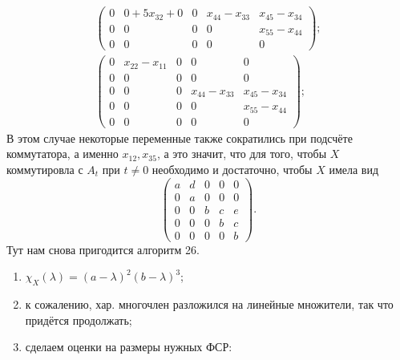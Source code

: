 \begin{itemize}
\begin{gather*}
\begin{pmatrix}
            0 & 0+5x_{32}+0 & 0 & x_{44}-x_{33} & x_{45}-x_{34}\\
            0 & 0 & 0 & 0 & x_{55}-x_{44}\\
            0 & 0 & 0 & 0 & 0
        \end{pmatrix};\\
        \begin{pmatrix}
            0 & x_{22}-x_{11} & 0 & 0 & 0\\
            0 & 0 & 0 & 0 & 0\\
            0 & 0 & 0 & x_{44}-x_{33} & x_{45}-x_{34}\\
            0 & 0 & 0 & 0 & x_{55}-x_{44}\\
            0 & 0 & 0 & 0 & 0
        \end{pmatrix};
    \end{gather*}
    В этом случае некоторые переменные также сократились при подсчёте коммутатора, а именно $x_{12}, x_{35}$, а это значит, что для того, чтобы $X$ коммутировла с $A_t$ при $t \ne 0$ необходимо и достаточно, чтобы $X$ имела вид
    $$\begin{pmatrix}
        a & d & 0 & 0 & 0\\
        0 & a & 0 & 0 & 0\\
        0 & 0 & b & c & e\\
        0 & 0 & 0 & b & c\\
        0 & 0 & 0 & 0 & b
    \end{pmatrix}.$$
    Тут нам снова пригодится алгоритм 26.
    \begin{enumerate}
        \item $\chi_X(\lambda) = (a-\lambda)^2(b-\lambda)^3$;
        \item к сожалению, хар. многочлен разложился на линейные множители, так что придётся продолжать;
        \item сделаем оценки на размеры нужных ФСР:
\end{enumerate}
\end{itemize}
